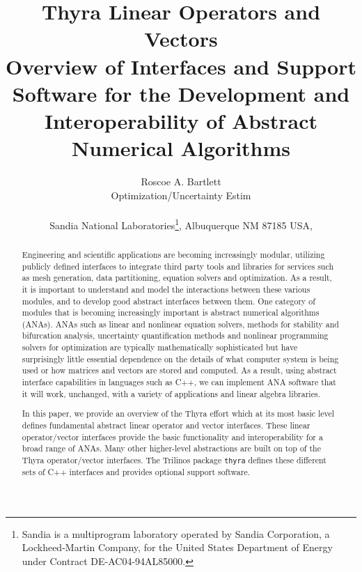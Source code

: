 \documentclass[pdf,ps2pdf,11pt]{SANDreport}
\title{\center
Thyra Linear Operators and Vectors\\[2ex]
{\Large Overview of Interfaces and Support Software for
the Development and Interoperability of Abstract Numerical Algorithms}}
\author{
Roscoe A. Bartlett \\ Optimization/Uncertainty Estim \\ \\ Sandia National
Laboratories\footnote{ Sandia is a multiprogram laboratory operated by Sandia
Corporation, a Lockheed-Martin Company, for the United States Department of
Energy under Contract DE-AC04-94AL85000.}, Albuquerque NM 87185 USA, \\ }
\date{}
\begin{document}
\maketitle

%

%
\begin{abstract}
%
Engineering and scientific applications are becoming increasingly modular,
utilizing publicly defined interfaces to integrate third party tools and
libraries for services such as mesh generation, data partitioning, equation
solvers and optimization.  As a result, it is important to understand and
model the interactions between these various modules, and to develop good
abstract interfaces between them.  One category of modules that is becoming
increasingly important is abstract numerical algorithms (ANAs).  ANAs such as
linear and nonlinear equation solvers, methods for stability and bifurcation
analysis, uncertainty quantification methods and nonlinear programming solvers
for optimization are typically mathematically sophisticated but have
surprisingly little essential dependence on the details of what computer
system is being used or how matrices and vectors are stored and computed.  As
a result, using abstract interface capabilities in languages such as C++, we
can implement ANA software that it will work, unchanged, with a variety of
applications and linear algebra libraries.

In this paper, we provide an overview of the Thyra effort which at its most
basic level defines fundamental abstract linear operator and vector
interfaces.  These linear operator/vector interfaces provide the basic
functionality and interoperability for a broad range of ANAs.  Many other
higher-level abstractions are built on top of the Thyra operator/vector
interfaces. The Trilinos package {}\texttt{thyra} defines these different sets
of C++ interfaces and provides optional support software.
%
\end{abstract}
%

%
\clearpage
\end{document}
